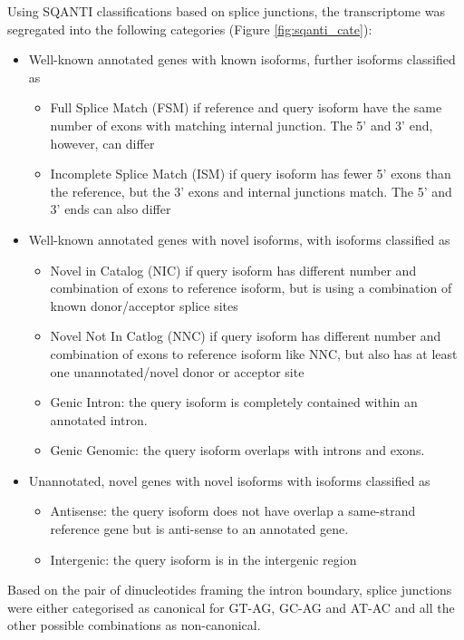 \label{section: sqanti_annotations}
Using SQANTI classifications based on splice junctions, the transcriptome was segregated into the following categories (Figure \ref{fig:sqanti_cate}): 
\begin{itemize}
	\item Well-known annotated genes with known isoforms, further isoforms classified as
	\begin{itemize}
		\item Full Splice Match (FSM) if reference and query isoform have the same number of exons with matching internal junction. The 5’ and 3’ end, however, can differ 
		\item Incomplete Splice Match (ISM) if query isoform has fewer 5’ exons than the reference, but the 3’ exons and internal junctions match. The 5’ and 3’ ends can also differ 
	\end{itemize}
	\item Well-known annotated genes with novel isoforms, with isoforms classified as
	\begin{itemize}
		\item Novel in Catalog (NIC) if query isoform has different number and combination of exons to reference isoform, but is using a combination of known donor/acceptor splice sites 
		\item Novel Not In Catlog (NNC) if query isoform has different number and combination of exons to reference isoform like NNC, but also has at least one unannotated/novel donor or acceptor site
		\item Genic Intron: the query isoform is completely contained within an annotated intron.
		\item Genic Genomic: the query isoform overlaps with introns and exons.
	\end{itemize}
	\item Unannotated, novel genes with novel isoforms with isoforms classified as
	\begin{itemize}
		\item Antisense: the query isoform does not have overlap a same-strand reference gene but is anti-sense to an annotated gene.
		\item Intergenic: the query isoform is in the intergenic region
	\end{itemize}
\end{itemize}

Based on the pair of dinucleotides framing the intron boundary, splice junctions were either categorised as canonical for GT-AG, GC-AG and AT-AC and all the other possible combinations as non-canonical.  

